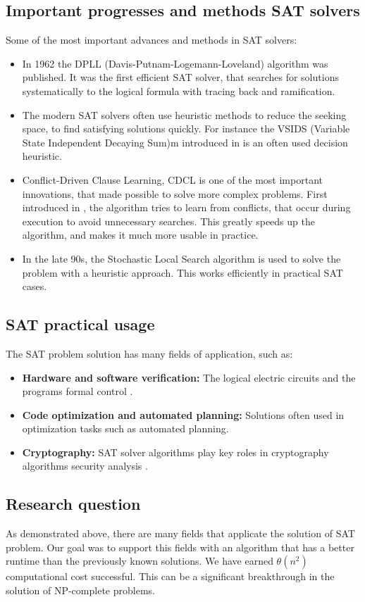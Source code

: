 \documentclass{article}
\begin{document}
\subsection{Important progresses and methods SAT solvers}
Some of the most important advances and methods in SAT solvers:
\begin{itemize}
    \item In 1962 the DPLL (Davis-Putnam-Logemann-Loveland) algorithm was published. It was the first efficient SAT solver, that searches for solutions systematically to the logical formula with tracing back and ramification.
    \item The modern SAT solvers often use heuristic methods to reduce the seeking space, to find satisfying solutions quickly. For instance the VSIDS (Variable State Independent Decaying Sum)m introduced in \cite{VSIDS} is an often used decision heuristic.
    \item Conflict-Driven Clause Learning, CDCL is one of the most important innovations, that made possible to solve more complex problems. First introduced in \cite{CDCL}, the algorithm tries to learn from conflicts, that occur during execution to avoid unnecessary searches. This greatly speeds up the algorithm, and makes it much more usable in practice.
    \item In the late 90s, the Stochastic Local Search algorithm is used to solve the problem with a heuristic approach. This works efficiently in practical SAT cases.
\end{itemize}

\subsection{SAT practical usage}
The SAT problem solution has many fields of application, such as:
\begin{itemize}
    \item \textbf{Hardware and software verification:} The logical electric circuits and the programs formal control \cite{c32SAT}.
    \item \textbf{Code optimization and automated planning:} Solutions often used in optimization tasks such as automated planning.
    \item \textbf{Cryptography:} SAT solver algorithms play key roles in cryptography algorithms security analysis \cite{SATInCrypto}.
\end{itemize}

\subsection{Research question}
As demonstrated above, there are many fields that applicate the solution of SAT problem. Our goal was to support this fields with an algorithm that has a better runtime than the previously known solutions. We have earned $\theta(n^2)$ computational cost successful. This can be a significant breakthrough in the solution of NP-complete problems.
\end{document}
